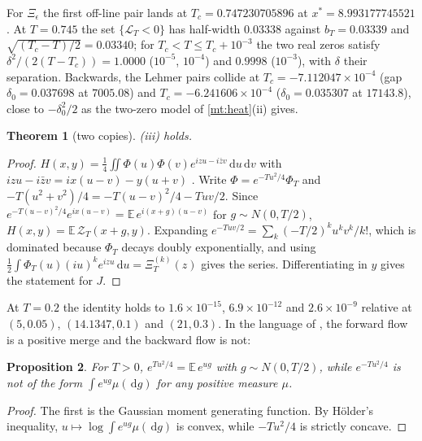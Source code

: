 \documentclass[11pt]{article}
\newtheorem{theorem}{Theorem}[section]
\newtheorem{proposition}[theorem]{Proposition}
\theoremstyle{definition}\newtheorem{definition}[theorem]{Definition}
\theoremstyle{remark}\newtheorem{remark}[theorem]{Remark}
\newcommand{\dd}{\,\mathrm d}\newcommand{\e}{\mathrm e}
\begin{document}
For $\Xi_\epsilon$ the first off-line pair lands at $T_c=0.747230705896$ at $x^*=8.993177745521$. At $T=0.745$ the set $\{\mathcal L_T<0\}$ has half-width $0.03338$ against $b_T=0.03339$ and $\sqrt{(T_c-T)/2}=0.03340$; for $T_c<T\le T_c+10^{-3}$ the two real zeros satisfy $\delta^2/(2(T-T_c))=1.0000$ ($10^{-5}$, $10^{-4}$) and $0.9998$ ($10^{-3}$), with $\delta$ their separation. Backwards, the Lehmer pairs collide at $T_c=-7.112047\times10^{-4}$ (gap $\delta_0=0.037698$ at $7005.08$) and $T_c=-6.241606\times10^{-4}$ ($\delta_0=0.035307$ at $17143.8$), close to $-\delta_0^2/2$ as the two-zero model of \cref{mt:heat}(ii) gives.

\begin{theorem}[two copies]\label{thm:twocopies}
(iii) holds.
\end{theorem}
\begin{proof}
$H(x,y)=\frac14\iint\Phi(u)\Phi(v)e^{izu-i\bar zv}\dd u\dd v$ with $izu-i\bar zv=ix(u-v)-y(u+v)$ \cite{S01}. Write $\Phi=e^{-Tu^2/4}\Phi_T$ and $-T(u^2+v^2)/4=-T(u-v)^2/4-Tuv/2$. Since $e^{-T(u-v)^2/4}e^{ix(u-v)}=\mathbb E\,e^{i(x+g)(u-v)}$ for $g\sim N(0,T/2)$, $H(x,y)=\mathbb E\,\mathcal Z_T(x+g,y)$. Expanding $e^{-Tuv/2}=\sum_k(-T/2)^ku^kv^k/k!$, which is dominated because $\Phi_T$ decays doubly exponentially, and using $\frac12\int\Phi_T(u)(iu)^ke^{izu}\dd u=\Xi_T^{(k)}(z)$ gives the series. Differentiating in $y$ gives the statement for $J$.
\end{proof}

At $T=0.2$ the identity holds to $1.6\times10^{-15}$, $6.9\times10^{-12}$ and $2.6\times10^{-9}$ relative at $(5,0.05)$, $(14.1347,0.1)$ and $(21,0.3)$. In the language of \cite{S01}, the forward flow is a positive merge and the backward flow is not:

\begin{proposition}\label{prop:notmerge}
For $T>0$, $e^{Tu^2/4}=\mathbb E\,e^{ug}$ with $g\sim N(0,T/2)$, while $e^{-Tu^2/4}$ is not of the form $\int e^{ug}\mu(\dd g)$ for any positive measure $\mu$.
\end{proposition}
\begin{proof}
The first is the Gaussian moment generating function. By H\"older's inequality, $u\mapsto\log\int e^{ug}\mu(\dd g)$ is convex, while $-Tu^2/4$ is strictly concave.
\end{proof}
\end{document}
